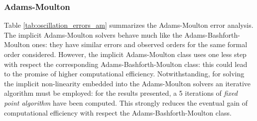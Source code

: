 \subsubsection{Adams-Moulton}

Table \ref{tab:oscillation_errors_am} summarizes the Adams-Moulton error analysis. The implicit Adams-Moulton solvers behave much like the Adams-Bashforth-Moulton ones: they have similar errors and observed orders for the same formal order considered. However, the implicit Adams-Moulton class uses one less step with respect the corresponding Adams-Bashforth-Moulton class: this could lead to the promise of higher computational efficiency. Notwithstanding, for solving the implicit non-linearity embedded into the Adams-Moulton solvers an iterative algorithm must be employed: for the results presented, a 5 iterations of \emph{fixed point algorithm} have been computed. This strongly reduces the eventual gain of computational efficiency with respect the Adams-Bashforth-Moulton class.

